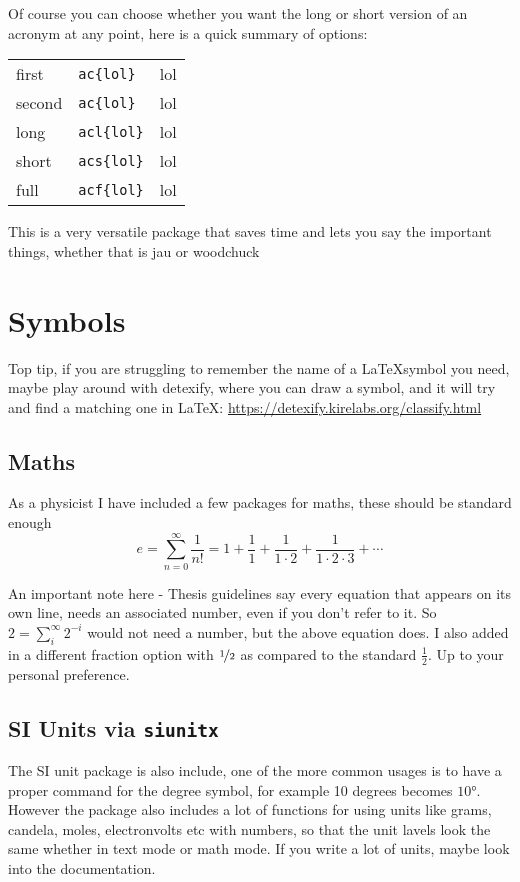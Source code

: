 \documentclass[../HWThesis.tex]{subfiles} %
\begin{document}
Of course you can choose whether you want the long or short version of an acronym at any point, here is a quick summary of options: 

\begin{tabular}{lll}
first &  \texttt{ac\{lol\}} & \ac{lol} \\
second & \texttt{ac\{lol\}}& \ac{lol} \\
long & \texttt{acl\{lol\}}  & \acl{lol} \\
short & \texttt{acs\{lol\}} & \acs{lol} \\
full & \texttt{acf\{lol\}}  & \acf{lol}
\end{tabular}

This is a very versatile package that saves time and lets you say the important things, whether that is  \ac{jau} or \ac{woodchuck}

\section{Symbols}
Top tip, if you are struggling to remember the name of a \LaTeX symbol you need, maybe play around with detexify, where you can draw a symbol, and it will try and find a matching one in \LaTeX: \url{https://detexify.kirelabs.org/classify.html} 
\subsection{Maths}
As a physicist I have included a few packages for maths, these should be standard enough 
\begin{equation}
e =  \sum\limits_{n = 0}^{\infty} \frac{1}{n!} = 1 + \frac{1}{1} + \frac{1}{1\cdot 2} + \frac{1}{1\cdot 2\cdot 3} + \cdots
\end{equation}

An important note here - Thesis guidelines say every equation that appears on its own line, needs an associated number, even if you don't refer to it. So $2 = \sum_i^\infty 2^{-i}$ would not need a number, but the above equation does. I also added in a different fraction option with $\nicefrac{1}{2}$ as compared to the standard $\frac{1}{2}$. Up to your personal preference. 

\subsection{SI Units via \texttt{siunitx}}
The SI unit package is also include, one of the more common usages is to have a proper command for the degree symbol, for example 10 degrees becomes \(\ang{10}\). However the package also includes a lot of functions for using units like grams, candela, moles, electronvolts etc with numbers, so that the unit lavels look the same whether in text mode or math mode. If you write a lot of units, maybe look into the documentation. 
\end{document}
